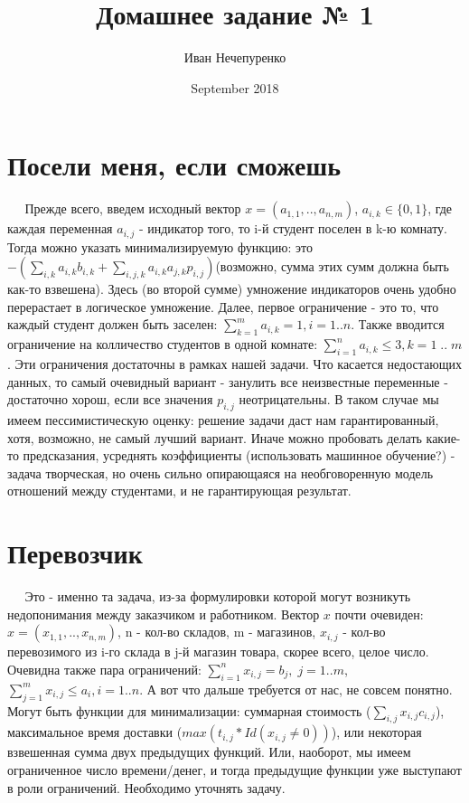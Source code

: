 \documentclass{article}
\title{Домашнее задание № 1}
\author{Иван Нечепуренко }
\date{September 2018}
\begin{document}
\maketitle

\section{Посели меня, если сможешь}
$\; \; \; \; \;$Прежде всего, введем исходный вектор $x = (a_{1,1}, .. , a_{n, m})$, $a_{i, k} \in  \{0, 1\} $, где каждая переменная $a_{i, j} $ - индикатор того, то i-й студент поселен в k-ю комнату. Тогда можно указать минимализируемую функцию: это $-(\sum\limits_{i, k}a_{i, k}b_{i, k} + \sum\limits_{i, j, k}a_{i, k}a_{j, k}p_{i, j})$(возможно, сумма этих сумм должна быть как-то взвешена). Здесь (во второй сумме) умножение индикаторов очень удобно перерастает в логическое умножение. Далее, первое ограничение - это то, что каждый студент должен быть заселен: $\sum\limits_{k = 1}^{m}a_{i, k} = 1, i = 1 .. n$. Также вводится ограничение на колличество студентов в одной комнате: $\sum\limits_{i = 1}^{n}a_{i, k} \leq 3, k = 1 \; .. \; m$. Эти ограничения достаточны в рамках нашей задачи. Что касается недостающих данных, то самый очевидный вариант - занулить все неизвестные переменные - достаточно хорош, если все значения $p_{i, j}$ неотрицательны. В таком случае мы имеем пессимистическую оценку: решение задачи даст нам гарантированный, хотя, возможно, не самый лучший вариант. Иначе можно пробовать делать какие-то предсказания, усреднять коэффициенты (использовать машинное обучение?) - задача творческая, но очень сильно опирающаяся на необговоренную модель отношений между студентами, и не гарантирующая результат.

\section{Перевозчик}
$\; \; \; \; \;$Это - именно та задача, из-за формулировки которой могут возникуть недопонимания между заказчиком и работником. Вектор $x$ почти очевиден: $x = (x_{1,1}, .. , x_{n, m})$, n - кол-во складов, m - магазинов, $x_{i, j}$ - кол-во перевозимого из i-го склада в j-й магазин товара, скорее всего, целое число. Очевидна также пара ограничений: $\sum\limits_{i = 1}^{n}x_{i, j} = b_j, \; j = 1 .. m$, $\sum\limits_{j = 1}^{m}x_{i, j} \leq a_i, i = 1 .. n$. А вот что дальше требуется от нас, не совсем понятно. Могут быть функции для минимализации: суммарная стоимость ($\sum\limits_{i, j}x_{i, j}c_{i, j} $), максимальное время доставки ($ max(t_{i, j}*Id(x_{i,j} \neq 0))$), или некоторая взвешенная сумма двух предыдущих функций. Или, наоборот, мы имеем ограниченное число времени/денег, и тогда предыдущие функции уже выступают в роли ограничений. Необходимо уточнять задачу.
\end{document}
